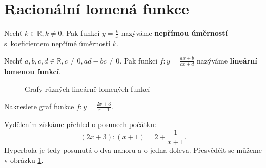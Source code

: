 \section{Racionální lomená funkce}
\begin{definition}
    Nechť $k \in \mathbb R, k \ne 0.$ Pak funkcí $y=\frac{k}{x}$
    nazýváme \textbf{nepřímou úměrností} s~koeficientem nepřímé úměrnosti $k$.
\end{definition}

\begin{definition}
    Nechť $a,b,c,d \in \mathbb R, c \ne 0, ad-bc \ne 0.$ Pak funkci
    $f\colon y=\frac{ax+b}{cx+d}$ nazýváme \textbf{lineární lomenou
    funkcí}.
\end{definition}

\begin{figure}[ht!]
  \centering
    \label{linlomfce}
  \caption{Grafy různých lineárně lomených funkcí}
\end{figure}

\begin{priklad}
Nakreslete graf funkce $f\colon y=\frac{2x+3}{x+1}.$
\end{priklad}

\begin{reseni}
Vydělením získáme přehled o posunech počátku:
\begin{equation*}
	(2x+3):(x+1)=2+\frac{1}{x+1}.
\end{equation*}
Hyperbola je tedy posunutá o dva nahoru a o jedna doleva. Přesvědčit se můžeme v obrázku \ref{linlomfce}.
\end{reseni}

